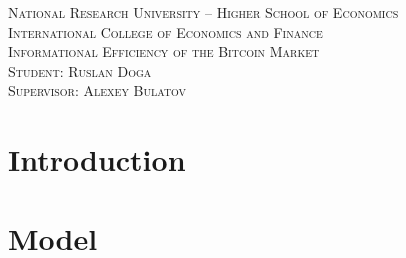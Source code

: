 \documentclass[a4paper,11pt]{article}
\begin{document}
  \begin{titlepage}
    \begin{center}
      \textsc{National Research University -- Higher School of Economics} \\[0.4cm]
      \textsc{International College of Economics and Finance}             \\[8.0cm]
      \textsc{\large Informational Efficiency of the Bitcoin Market}            \\[12cm]
      \textsc{Student: Ruslan Doga}                                       \\[0.4cm]
      \textsc{Supervisor: Alexey Bulatov}
    \end{center}
  \end{titlepage}

  \tableofcontents
  \pagebreak


  \section{Introduction}



  \section{Model}
\end{document}
